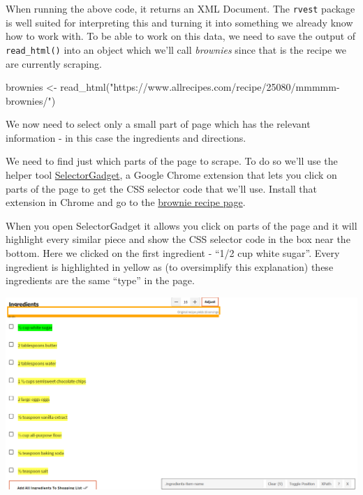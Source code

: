 \documentclass[
  12pt,
  openany]{book}
\newenvironment{Shaded}{\begin{snugshade}}{\end{snugshade}}
\newcommand{\FunctionTok}[1]{\textcolor[rgb]{0,0,0}{#1}}
\newcommand{\NormalTok}[1]{#1}
\newcommand{\OtherTok}[1]{\textcolor[rgb]{0.37,0.37,0.37}{#1}}
\newcommand{\StringTok}[1]{\textcolor[rgb]{0.5,0.5,0.5}{#1}}
\begin{document}
When running the above code, it returns an XML Document. The \texttt{rvest} package is well suited for interpreting this and turning it into something we already know how to work with. To be able to work on this data, we need to save the output of \texttt{read\_html()} into an object which we'll call \emph{brownies} since that is the recipe we are currently scraping.

\begin{Shaded}
\begin{Highlighting}[]
\NormalTok{brownies }\OtherTok{\textless{}{-}} \FunctionTok{read\_html}\NormalTok{(}\StringTok{"https://www.allrecipes.com/recipe/25080/mmmmm{-}brownies/"}\NormalTok{)}
\end{Highlighting}
\end{Shaded}

We now need to select only a small part of page which has the relevant information - in this case the ingredients and directions.

We need to find just which parts of the page to scrape. To do so we'll use the helper tool \href{https://selectorgadget.com/}{SelectorGadget}, a Google Chrome extension that lets you click on parts of the page to get the CSS selector code that we'll use. Install that extension in Chrome and go to the \href{https://www.allrecipes.com/recipe/25080/mmmmm-brownies/?internalSource=hub\%20recipe\&referringContentType=Search}{brownie recipe page}.

When you open SelectorGadget it allows you click on parts of the page and it will highlight every similar piece and show the CSS selector code in the box near the bottom. Here we clicked on the first ingredient - ``1/2 cup white sugar''. Every ingredient is highlighted in yellow as (to oversimplify this explanation) these ingredients are the same ``type'' in the page.

\includegraphics{images/brownies_3.PNG}
\end{document}
